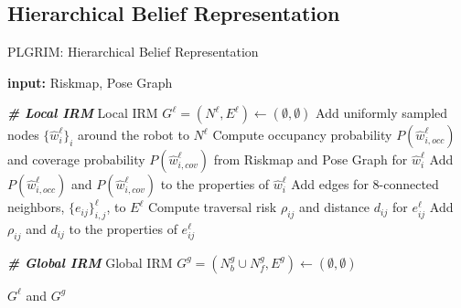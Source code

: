 \documentclass[letterpaper]{article} %
\begin{document}
\subsection{Hierarchical Belief Representation} \label{ssec:belief-managers}
\begin{algorithm}[t!]
{\fontsize{8.5pt}{9.8pt}\selectfont
\caption{PLGRIM: Hierarchical Belief Representation}
\label{alg:IRMs}
\begin{algorithmic}
  \STATE \textbf{input:} Riskmap, Pose Graph %

  \vspace{3pt}
  \STATE \textbf{\textit{\# Local IRM}}
  \STATE Local IRM $G^\ell = (N^\ell, E^\ell) \gets (\emptyset, \emptyset)$
  \STATE Add uniformly sampled nodes $\{\hat{w}^\ell_i\}_i$ around the robot to $N^\ell$
    \STATE Compute occupancy probability $P(\hat{w}^\ell_{i,occ})$ and coverage probability $P(\hat{w}^\ell_{i,cov})$ from Riskmap and Pose Graph for $\hat{w}^\ell_i$
    \STATE Add $P(\hat{w}^\ell_{i,occ})$ and $P(\hat{w}^\ell_{i,cov})$ to the properties of $\hat{w}^\ell_i$
  \ENDFOR
  \STATE Add edges for 8-connected neighbors, $\{e_{ij}\}^\ell_{i,j}$, to $E^\ell$
    \STATE Compute traversal risk $\rho_{ij}$ and distance $d_{ij}$ for $e^\ell_{ij}$
    \STATE Add $\rho_{ij}$ and $d_{ij}$ to the properties of $e^\ell_{ij}$
  \ENDFOR

  \vspace{3pt}
  \STATE \textbf{\textit{\# Global IRM}}
    \STATE Global IRM $G^g = (N^g_b \cup N^g_f, E^g) \gets (\emptyset, \emptyset)$
  \ENDIF
  \STATE [TODO]
  \IF {}
    \STATE
  \ENDIF

  \STATE 
  \STATE 
  \STATE 
  \STATE 
  \STATE 
  \STATE 
  \STATE 

  \RETURN $G^\ell$ and $G^g$

\end{algorithmic}
} %
\end{algorithm}


%
\end{document}
